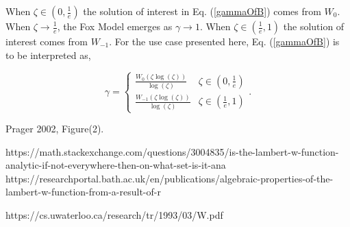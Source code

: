 \documentclass[12pt]{article}
\begin{document}
%
When $\zeta\in\left(0, \frac{1}{e}\right)$ the solution of interest in Eq. (\ref{gammaOfB}) 
comes from $W_0$. %
When $\zeta\to\frac{1}{e}$, the Fox Model emerges as $\gamma\to1$.
When $\zeta\in\left(\frac{1}{e}, 1\right)$ the solution of interest comes from 
$W_{-1}$. For the use case presented here, Eq. (\ref{gammaOfB}) is to be interpreted as,

\begin{equation}
\gamma = 
\begin{cases} 
\frac{W_0\left(\zeta\log\left(\zeta\right)\right)}{\log\left(\zeta\right)} & \zeta\in\left(0, \frac{1}{e}\right)\\
\frac{W_{-1}\left(\zeta\log\left(\zeta\right)\right)}{\log\left(\zeta\right)} & \zeta\in\left(\frac{1}{e}, 1\right)
\end{cases}. 
\end{equation} 

%
Prager 2002, Figure(2).



https://math.stackexchange.com/questions/3004835/is-the-lambert-w-function-analytic-if-not-everywhere-then-on-what-set-is-it-ana
https://researchportal.bath.ac.uk/en/publications/algebraic-properties-of-the-lambert-w-function-from-a-result-of-r

%
https://cs.uwaterloo.ca/research/tr/1993/03/W.pdf

%
\end{document}
